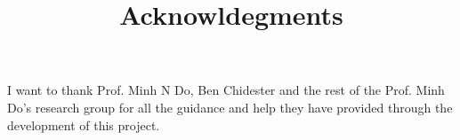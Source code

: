 \title{Acknowldegments}

I want to thank Prof. Minh N Do, Ben Chidester and the rest of the 
Prof. Minh Do's research group for all the guidance and help they 
have provided through the development of this project.